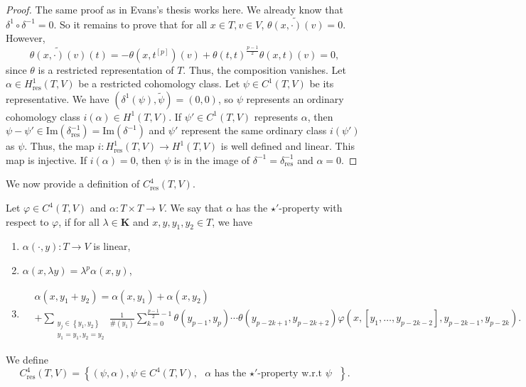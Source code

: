 \documentclass[11pt, twoside]{article}
\begin{document}
\begin{proof} The same proof as in Evans's thesis works here. We already know that $\delta^1\circ \delta^{-1}=0 $. So it remains to prove that for all $x\in T,v\in V$, $\widetilde{\theta(x,\cdot)(v)}=0 $. However, $$\widetilde{\theta(x,\cdot)(v)}(t)=- \theta(x,t^{[p]})(v)+ \theta(t,t)^{\frac{p-1}{2}}\theta(x,t)(v)=0, $$ since $\theta$ is a restricted representation of $T$. Thus, the composition vanishes. Let $\alpha\in H_\mathrm{res}^1(T,V) $ be a restricted cohomology class. Let $\psi\in C^1(T,V) $ be its representative. We have $(\delta^1(\psi),\tilde{\psi})=(0,0) $, so $\psi$ represents an ordinary cohomology class $i(\alpha)\in H^1(T,V) $. If $\psi'\in C^1(T,V)$ represents $\alpha$, then $\psi-\psi'\in \mathrm{Im}(\delta^{-1}_\mathrm{res})=\mathrm{Im}(\delta^{-1}) $ and $\psi' $ represent the same ordinary class $i(\psi') $ as $\psi$. Thus, the map $i:H_\mathrm{res}^1(T,V)\to H^1(T,V) $ is well defined and linear. This map is injective. If $i(\alpha)=0 $, then $\psi$ is in the image of $\delta^{-1}=\delta_\mathrm{res}^{-1} $ and $\alpha=0$.
\end{proof}

We now provide a definition of $C^4_\mathrm{res}(T,V) $. 

\begin{defi}
    Let $\varphi\in C^4(T,V) $ and  $\alpha:T\times T\to V$. We say that $\alpha $ has the $\star'$-property with respect to $\varphi $, if for all $\lambda\in \mathbf{K}$ and $x,y,y_1,y_2\in T$, we have  \begin{enumerate}
    \item $\alpha(\cdot,y):T\to V$ is linear,
    \item $\alpha( x,\lambda y)= \lambda^p\alpha(x,y) $,
    \item {\small\begin{align*}
       & \alpha(x,y_1+y_2)= \alpha(x,y_1)+\alpha(x,y_2)\\ &  +  \sum_{\substack{y_j\in \left\{y_1,y_2 \right\}\\y_1=y_1,y_2=y_2}}\frac{1}{\#(y_1)}\sum\limits_{k=0}^{\frac{p-1}{2}-1}\theta(y_{p-1},y_p)\cdots\theta(y_{p-2k+1},y_{p-2k+2}) \varphi(x,[y_1,\ldots,y_{p-2k-2}],y_{p-2k-1},y_{p-2k}).
    \end{align*}}
\end{enumerate} We define $$C^4_\mathrm{res}(T,V)= \left\{(\psi,\alpha), \psi\in C^4(T,V),\text{ $\alpha$   has the  $\star'$-property w.r.t $\psi$ }\right\}. $$
\end{defi}
\end{document}
